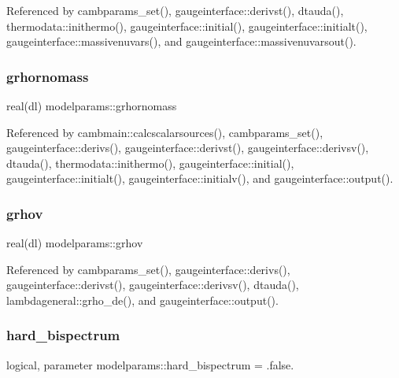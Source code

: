 Referenced by cambparams\+\_\+set(), gaugeinterface\+::derivst(), dtauda(), thermodata\+::inithermo(), gaugeinterface\+::initial(), gaugeinterface\+::initialt(), gaugeinterface\+::massivenuvars(), and gaugeinterface\+::massivenuvarsout().

\mbox{\label{namespacemodelparams_a4c2d2ed96d5c953938367cc867157072}} 
\subsubsection{\texorpdfstring{grhornomass}{grhornomass}}
{\footnotesize\ttfamily real(dl) modelparams\+::grhornomass}



Referenced by cambmain\+::calcscalarsources(), cambparams\+\_\+set(), gaugeinterface\+::derivs(), gaugeinterface\+::derivst(), gaugeinterface\+::derivsv(), dtauda(), thermodata\+::inithermo(), gaugeinterface\+::initial(), gaugeinterface\+::initialt(), gaugeinterface\+::initialv(), and gaugeinterface\+::output().

\mbox{\label{namespacemodelparams_a8c39e1bc5579fca9396e8d526ccd36f7}} 
\subsubsection{\texorpdfstring{grhov}{grhov}}
{\footnotesize\ttfamily real(dl) modelparams\+::grhov}



Referenced by cambparams\+\_\+set(), gaugeinterface\+::derivs(), gaugeinterface\+::derivst(), gaugeinterface\+::derivsv(), dtauda(), lambdageneral\+::grho\+\_\+de(), and gaugeinterface\+::output().

\mbox{\label{namespacemodelparams_a0dda4d3f4b77e14c2635221cdf01de0f}} 
\subsubsection{\texorpdfstring{hard\+\_\+bispectrum}{hard\_bispectrum}}
{\footnotesize\ttfamily logical, parameter modelparams\+::hard\+\_\+bispectrum = .false.}



